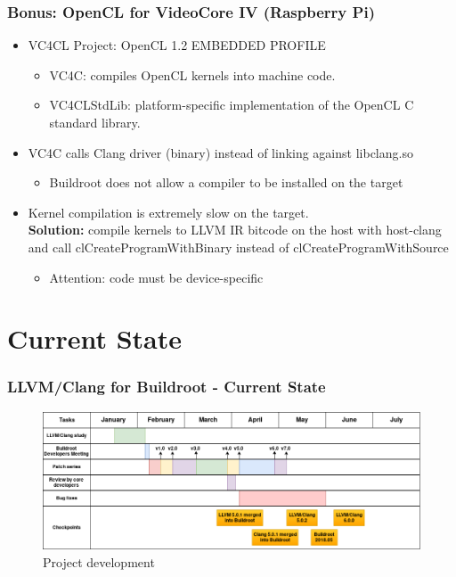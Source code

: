 \documentclass{smilebeamer}
\begin{document}
\begin{frame}
\frametitle{Bonus: OpenCL for VideoCore IV (Raspberry Pi)}
\begin{itemize}
  \item VC4CL Project: OpenCL 1.2 EMBEDDED PROFILE
  \begin{itemize}
    \item VC4C: compiles OpenCL kernels into machine code.
    \item VC4CLStdLib: platform-specific implementation of the OpenCL C standard
    library.
  \end{itemize}
  \item VC4C calls Clang driver (binary) instead of linking against libclang.so
  \begin{itemize}
    \item Buildroot does not allow a compiler to be installed on the target
  \end{itemize}
  \item Kernel compilation is extremely slow on the target.\\
  \textbf{Solution:} compile kernels to LLVM IR bitcode on the host with host-clang and
  call {\selectfont clCreateProgramWithBinary} instead of
  {\selectfont clCreateProgramWithSource}
  \begin{itemize}
    \item Attention: code must be device-specific
  \end{itemize}
\end{itemize}
\end{frame}

\section{Current State}

\begin{frame}
\frametitle{LLVM/Clang for Buildroot - Current State}
\begin{figure}
\includegraphics[width=1.\linewidth]{img/timeline4.png}
\caption{Project development}
\end{figure}
\end{frame}
\end{document}
